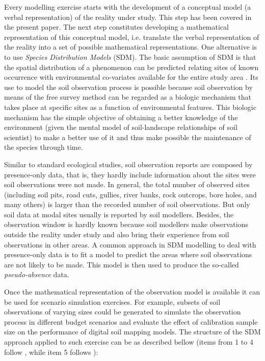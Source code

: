 Every modelling exercise starts with the development of a conceptual model (a verbal representation) of the 
reality under study. This step has been covered in the present paper. The next step constitutes developing a 
mathematical representation of this conceptual model, i.e. translate the verbal representation of the reality 
into a set of possible mathematical representations. One alternative is to use \textit{Species Distribution 
Models} (SDM). The basic assumption of SDM is that the spatial distribution of a phenomenon can be predicted 
relating sites of known occurrence with environmental co-variates available for the entire study area 
\cite{HenglEtAl2009e, WartonEtAl2010, HijmansEtAl2013}. Its use to model the soil observation process is 
possible because soil observation by means of the free survey method can be regarded as a biologic mechanism 
that takes place at specific sites as a function of environmental features. This biologic mechanism has the 
simple objective of obtaining a better knowledge of the environment (given the mental model of soil-landscape 
relationships of soil scientist) to make a better use of it and thus make possible the maintenance of the 
species through time.

Similar to standard ecological studies, soil observation reports are composed by presence-only data, that is, 
they hardly include information about the sites were soil observations were not made. In general, the total 
number of observed sites (including soil pits, road cuts, gullies, river banks, rock outcrops, bore holes, and 
many others) is larger than the recorded number of soil observations. But only soil data at modal sites usually
is reported by soil modellers. Besides, the observation window is hardly known because soil modellers make 
observations outside the reality under study and also bring their experience from soil observations in other 
areas. A common approach in SDM modelling to deal with presence-only data is to fit a model to predict the 
areas where soil observations are not likely to be made. This model is then used to produce the so-called 
\textit{pseudo-absence} data.

Once the mathematical representation of the observation model is available it can be used for scenario 
simulation exercises. For example, subsets of soil observations of varying sizes could be generated to simulate
the observation process in different budget scenarios and evaluate the effect of calibration sample size on the
performance of digital soil mapping models. The structure of the SDM approach applied to such exercise can be 
as described bellow (items from \num{1} to \num{4} follow , while item 5 follows 
):

